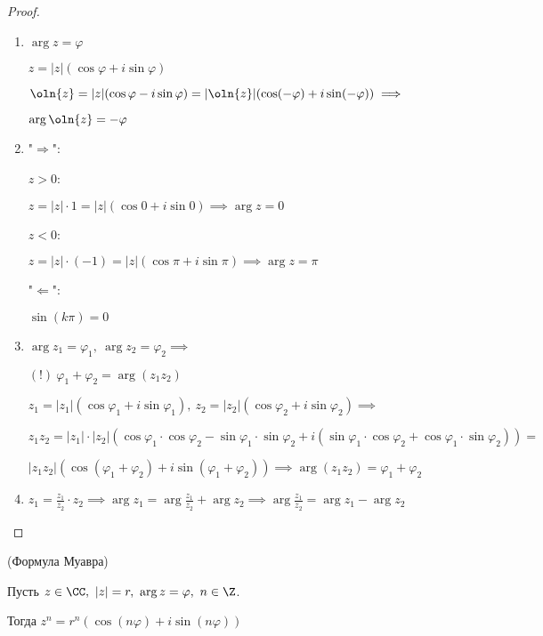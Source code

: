 \begin{proof}
    \begin{enumerate}
        \item $\arg z = \varphi$
        
        $z = |z|(\cos\varphi + i\sin\varphi)$
        
        $\oln{z} = |z|(\cos\varphi - i\sin\varphi) = |\oln{z}|(\cos(-\varphi) + i\sin(-\varphi)) \implies$
        
        $\arg \oln{z} = -\varphi$

        \item "$\Rightarrow$":
        
        $z > 0$: 
        
        $z = |z| \cdot 1 = |z|(\cos 0 + i\sin 0) \implies \arg z = 0$
        
        $z < 0$: 
        
        $z = |z| \cdot (-1) = |z|(\cos \pi + i\sin \pi) \implies \arg z = \pi$
        
        "$\Leftarrow$":
        
        $\sin(k \pi) = 0$

        \item $\arg z_1 = \varphi_1,~\arg z_2 = \varphi_2 \implies$
        
        $(!)~\varphi_1 + \varphi_2 = \arg(z_1 z_2)$
        
        $z_1 = |z_1|(\cos\varphi_1 + i\sin\varphi_1),~z_2 = |z_2|(\cos\varphi_2 + i\sin\varphi_2) \implies$
        
        $z_1 z_2 = |z_1| \cdot |z_2|(\cos\varphi_1 \cdot \cos\varphi_2 - \sin\varphi_1 \cdot \sin\varphi_2 + i(\sin\varphi_1 \cdot \cos\varphi_2 + \cos\varphi_1 \cdot \sin\varphi_2)) =$
        
        $|z_1 z_2|(\cos(\varphi_1 + \varphi_2) + i\sin(\varphi_1 + \varphi_2)) \implies \arg(z_1 z_2) = \varphi_1 + \varphi_2$

        \item $z_1 = \frac{z_1}{z_2} \cdot z_2 \implies \arg z_1 = \arg \frac{z_1}{z_2} + \arg z_2 \implies \arg \frac{z_1}{z_2} = \arg z_1 - \arg z_2$

    \end{enumerate}
\end{proof}

\begin{follow}(Формула Муавра)

    Пусть $z \in \CC,~|z| = r,~\arg z = \varphi,~n \in \Z$.

    Тогда $z^n = r^n(\cos(n\varphi) + i\sin(n\varphi))$
\end{follow}

